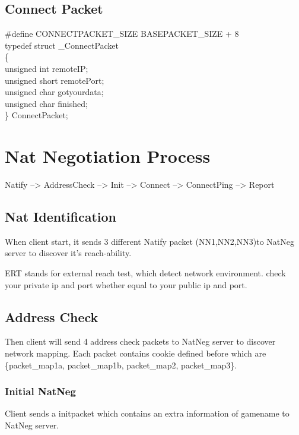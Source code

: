 \documentclass[oneside,titlepage,a4paper]{Definition/retrospy} %
\begin{document}
\subsection{Connect Packet}

\begin{mybox}
	\#define CONNECTPACKET\_SIZE BASEPACKET\_SIZE + 8\\
	typedef struct \_ConnectPacket\\
	\{\\
	unsigned int remoteIP;\\
	unsigned short remotePort;\\
	unsigned char gotyourdata;\\
	unsigned char finished;\\
	\} ConnectPacket;\\
\end{mybox}

\section{Nat Negotiation Process}

Natify --> AddressCheck --> Init --> Connect --> ConnectPing --> Report



\subsection{Nat Identification}

When client start, it sends 3 different Natify packet (NN1,NN2,NN3)to NatNeg server to discover it's reach-ability.

ERT stands for external reach test, which detect network environment. check your private ip and port whether equal to your public ip and port.
\subsection{Address Check}
Then client will send 4 address check packets to NatNeg server to discover network mapping. Each packet contains cookie defined before which are \{packet\_map1a, packet\_map1b, packet\_map2, packet\_map3\}.

\subsubsection{Initial NatNeg}

\ClientRequest
Client sends a initpacket which contains an extra information of gamename to NatNeg server.
\end{document}
